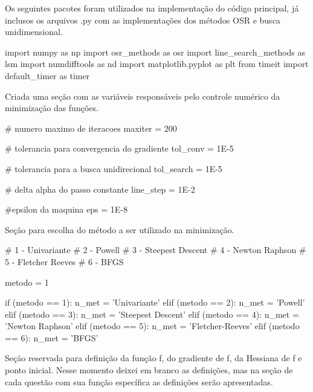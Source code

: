 \documentclass[10pt, a4paper]{article}
\begin{document}
Os seguintes pacotes foram utilizados na implementação do código principal, já inclusos os arquivos .py com as implementações dos métodos OSR e busca unidimensional.

\begin{python}
  import numpy as np
  import osr_methods as osr
  import line_search_methods as lsm
  import numdifftools as nd
  import matplotlib.pyplot as plt
  from timeit import default_timer as timer
\end{python}

Criada uma seção com as variáveis responsáveis pelo controle numérico da minimização das funções.

\begin{python}
  # numero maximo de iteracoes 
  maxiter = 200

  # tolerancia para convergencia do gradiente
  tol_conv = 1E-5

  # tolerancia para a busca unidirecional
  tol_search = 1E-5

  # delta alpha do passo constante
  line_step = 1E-2

  #epsilon da maquina
  eps = 1E-8
\end{python}

Seção para escolha do método a ser utilizado na minimização.

\begin{python}
  # 1 - Univariante
  # 2 - Powell
  # 3 - Steepest Descent
  # 4 - Newton Raphson
  # 5 - Fletcher Reeves
  # 6 - BFGS

  metodo = 1

  if (metodo == 1):
      n_met = 'Univariante'
  elif (metodo == 2):
      n_met = 'Powell'
  elif (metodo == 3):
      n_met = 'Steepest Descent'
  elif (metodo == 4):
      n_met = 'Newton Raphson'
  elif (metodo == 5):
      n_met = 'Fletcher-Reeves'
  elif (metodo == 6):
      n_met = 'BFGS'
\end{python}

Seção reservada para definição da função f, do gradiente de f, da Hessiana de f e ponto inicial. Nesse momento deixei em branco as definições, mas na seção de cada 
questão com sua função específica as definições serão apresentadas.

\end{document}
